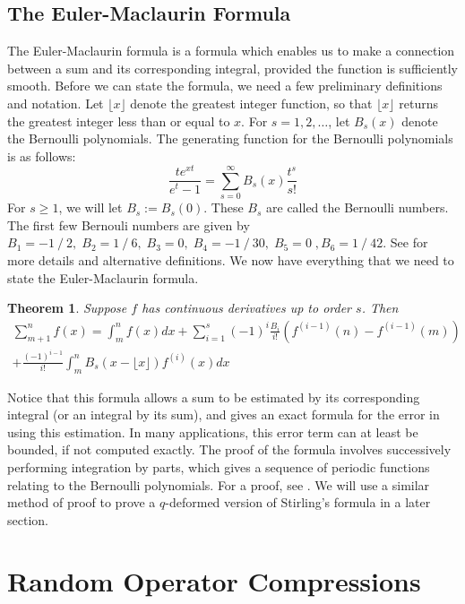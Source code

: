 \documentclass[12pt]{report}
\newtheorem{thm}{Theorem}[section]
\theoremstyle{definition}
\begin{document}
\section{The Euler-Maclaurin Formula}
The Euler-Maclaurin formula is a formula which enables us to make a connection between a sum and its corresponding integral, provided the function is sufficiently smooth.  Before we can state the formula, we need a few preliminary definitions and notation.  Let $\lfloor x\rfloor$ denote the greatest integer function, so that $\lfloor x\rfloor$ returns the greatest integer less than or equal to $x$.  For $s=1,2,\dots$, let $B_s(x)$ denote the Bernoulli polynomials.  The generating function for the Bernoulli polynomials is as follows:
$$
\frac{te^{xt}}{e^t-1}=\sum_{s=0}^{\infty} B_s(x)\frac{t^s}{s!}
$$
For $s\geq 1$, we will let $B_s:=B_s(0)$.  These $B_s$ are called the Bernoulli numbers.  The first few Bernouli numbers are given by $ B_1 = -1⁄2,\; B_2 = 1⁄6,\; B_3 = 0 ,\; B_4 = −1⁄30, \;B_5 = 0\;, B_6 = 1⁄42$.  See \cite{AndrewsAskeyRoy} for more details and alternative definitions.  We now have everything that we need to state the Euler-Maclaurin formula.
\begin{thm}
Suppose $f$ has continuous derivatives up to order $s$.  Then 
\begin{multline}
\sum_{m+1}^n f(x)=\int_m^n f(x) dx+\sum_{i=1}^s(-1)^i\frac{B_i}{i!}(f^{(i-1)}(n)-f^{(i-1)}(m)) \\ +\frac{(-1)^{i-1}}{i!}\int_m^n B_s(x-\lfloor x\rfloor)f^{(i)}(x) dx
\end{multline}
\end{thm}
Notice that this formula allows a sum to be estimated by its corresponding integral (or an integral by its sum), and gives an exact formula for the error in using this estimation.  In many applications, this error term can at least be bounded, if not computed exactly. The proof of the formula involves successively performing integration by parts, which gives a sequence of periodic functions relating to the Bernoulli polynomials.  For a proof, see \cite{AndrewsAskeyRoy}.   We will use a similar method of proof to prove a $q$-deformed version of Stirling's formula in a later section.  
\chapter{Random Operator Compressions}
\end{document}

